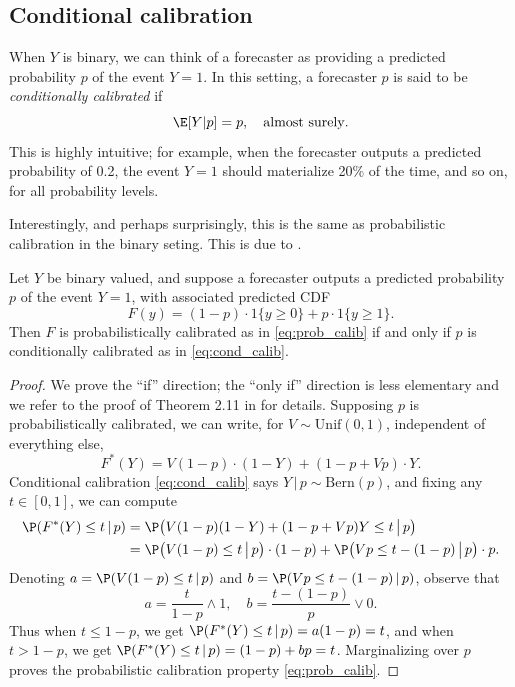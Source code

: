 \documentclass{article}
\begin{document}
\subsection{Conditional calibration}

When $Y$ is binary, we can think of a forecaster as providing a predicted
probability $p$ of the event $Y = 1$. In this setting, a forecaster $p$ is said
to be \emph{conditionally calibrated} if
\begin{equation}
\label{eq:cond_calib}
\E[Y|p] = p, \quad \text{almost surely}.  
\end{equation}
This is highly intuitive; for example, when the forecaster outputs a predicted
probability of 0.2, the event $Y=1$ should materialize 20\% of the time, and so
on, for all probability levels. 

Interestingly, and perhaps surprisingly, this is the same as probabilistic
calibration in the binary seting. This is due to \citet{gneiting2013combining}. 

\begin{theorem}
Let $Y$ be binary valued, and suppose a forecaster outputs a predicted
probability $p$ of the event $Y = 1$, with associated predicted CDF 
\[
F(y) = (1-p) \cdot 1\{y \geq 0\} +  p \cdot 1\{y \geq 1\}.
\]
Then $F$ is probabilistically calibrated as in \eqref{eq:prob_calib} if and only
if $p$ is conditionally calibrated as in \eqref{eq:cond_calib}. 
\end{theorem}

\begin{proof}
We prove the ``if'' direction; the ``only if'' direction is less elementary and 
we refer to the proof of Theorem 2.11 in \citet{gneiting2013combining} for
details. Supposing $p$ is probabilistically calibrated, we can write, for $V
\sim \mathrm{Unif}(0,1)$, independent of everything else, 
\[
F^*(Y) = V (1-p) \cdot (1-Y) + (1-p + V p) \cdot Y.
\]
Conditional calibration \eqref{eq:cond_calib} says $Y\,|\,p \sim
\mathrm{Bern}(p)$, and fixing any $t \in [0,1]$, we can compute    
\begin{align*}
\P(F^*(Y) \leq t \,|\, p) 
&= \P\big( V (1-p) (1-Y) + (1-p + V p) Y \leq t \,\big|\, p \big) \\
&= \P\big( V (1-p) \leq t \,\big|\, p \big) \cdot (1-p) + \P\big( V p \leq 
  t-(1-p) \,\big|\, p \big) \cdot p.
\end{align*}
Denoting $a = \P(V (1-p) \leq t \,|\, p)$ and $b = \P(V p \leq t-(1-p) \,|\,
p)$, observe that 
\[
a = \frac{t}{1-p} \wedge 1, 
\quad
b = \frac{t-(1-p)}{p} \vee 0.
\]
Thus when $t \leq 1-p$, we get $\P(F^*(Y) \leq t \,|\, p) = a(1-p) = t$, and
when $t > 1-p$, we get $\P(F^*(Y) \leq t \,|\, p) = (1-p) + bp =
t$. Marginalizing over $p$ proves the probabilistic calibration property
\eqref{eq:prob_calib}.  
\end{proof}
\end{document}
